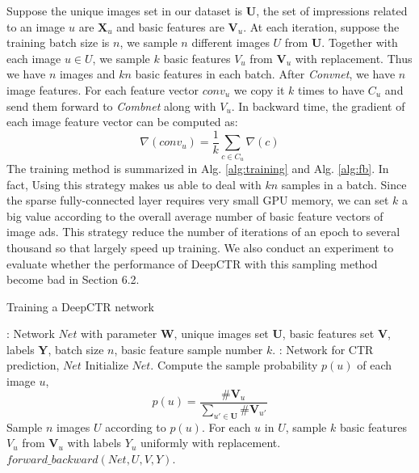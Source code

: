 \documentclass{sig-alternate}
\begin{document}
Suppose the unique  images set in our dataset is $\mathbf{U}$, the set of impressions related to an image $u$ are $\mathbf{X}_{u}$ and basic features are $\mathbf{V}_{u}$. At each iteration, suppose the training batch size is $n$, we sample $n$ different images $U$ from $\mathbf{U}$. Together with each image $u \in U$, we sample $k$ basic features $V_{u}$ from $\mathbf{V}_{u}$ with replacement. Thus we have $n$ images and $kn$ basic features in each batch.   After \emph{Convnet}, we have $n$ image features. For each feature vector $conv_{u}$ we copy it $k$ times to have $C_{u}$ and send them forward to \emph{Combnet} along with $V_{u}$. In backward time, the gradient of each image feature vector can be computed as:
\begin{equation}\label{eq:gradient}
\nabla(conv_{u}) = \frac{1}{k} \sum_{c \in C_{u}} \nabla(c)  
\end{equation}
The training method is summarized in Alg. \ref{alg:training} and Alg. \ref{alg:fb}. In fact, Using this strategy makes us able to deal with $kn$ samples in a batch. Since the sparse fully-connected layer requires very small GPU memory, we can set $k$ a big value according to the overall average number of basic feature vectors of image ads. This strategy reduce the number of iterations of an epoch to several thousand so that largely  speed up training. We also conduct an experiment to evaluate whether  the performance of DeepCTR with this sampling method become bad in Section  6.2.
\begin{algorithm}[tb]
	\caption{Training a DeepCTR network}
	\label{alg:training}
	\begin{algorithmic}[1]
		\renewcommand{\algorithmicrequire}{\textbf{Input:}}
		\renewcommand{\algorithmicensure}{\textbf{Output:}}
		\Require: Network $Net$ with parameter $\mathbf{W}$, unique images set $\mathbf{U}$, basic features set $\mathbf{V}$, labels $\mathbf{Y}$, batch size $n$, basic feature sample number $k$.  
		\Ensure: Network for CTR prediction, $Net$
		\State Initialize $Net$.
		\State Compute the sample probability $p(u)$ of each image $u$,
		\begin{equation}
		p(u) = \frac{\# \mathbf{V}_{u}}{\sum_{u' \in \mathbf{U}} \# \mathbf{V}_{u'}}
		\end{equation}
		\Repeat
		\State Sample $n$ images $U$ according to $p(u)$. 
		\State For each $u$ in $U$, sample $k$ basic features $V_{u}$ from $\mathbf{V}_{u}$ with labels $Y_{u}$ uniformly with replacement. 
		\State $forward\_backward(Net, U, V, Y)$.
	\end{algorithmic}
\end{algorithm}  
\end{document}
